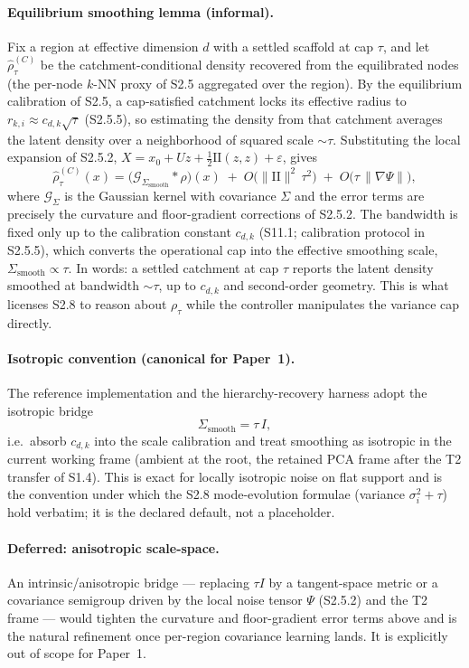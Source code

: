 \documentclass[11pt]{article}
\begin{document}
\paragraph{Equilibrium smoothing lemma (informal).}
Fix a region at effective dimension $d$ with a settled scaffold at cap $\tau$,
and let $\widehat\rho^{(C)}_\tau$ be the catchment-conditional density recovered
from the equilibrated nodes (the per-node $k$-NN proxy of S2.5 aggregated over
the region). By the equilibrium calibration of S2.5, a cap-satisfied catchment
locks its effective radius to $r_{k,i}\approx c_{d,k}\sqrt\tau$ (S2.5.5), so estimating the
density from that catchment averages the latent density over a neighborhood of
squared scale $\sim\tau$. Substituting the local expansion of S2.5.2,
$X=x_0+Uz+\tfrac12\mathrm{II}(z,z)+\varepsilon$, gives
\[
\widehat\rho^{(C)}_\tau(x)
=
\bigl(\mathcal G_{\Sigma_{\mathrm{smooth}}}\!*\rho\bigr)(x)
\;+\;
O\!\bigl(\|\mathrm{II}\|^2\,\tau^2\bigr)
\;+\;
O\!\bigl(\tau\,\|\nabla\Psi\|\bigr),
\]
where $\mathcal G_\Sigma$ is the Gaussian kernel with covariance $\Sigma$ and the
error terms are precisely the curvature and floor-gradient corrections of
S2.5.2. The bandwidth is fixed only up to the calibration constant $c_{d,k}$
(S11.1; calibration protocol in S2.5.5), which converts the operational
cap into the effective smoothing scale, $\Sigma_{\mathrm{smooth}}\propto\tau$. In
words: a settled catchment at cap $\tau$ reports the latent density smoothed at
bandwidth $\sim\tau$, up to $c_{d,k}$ and second-order geometry. This is what
licenses S2.8 to reason about $\rho_\tau$ while the controller manipulates the
variance cap directly.

\paragraph{Isotropic convention (canonical for Paper~1).}
The reference implementation and the hierarchy-recovery harness adopt the
isotropic bridge
\[
\Sigma_{\mathrm{smooth}}=\tau\,I,
\]
i.e.\ absorb $c_{d,k}$ into the scale calibration and treat smoothing as
isotropic in the current working frame (ambient at the root, the retained PCA
frame after the T2 transfer of S1.4). This is exact for locally isotropic noise
on flat support and is the convention under which the S2.8 mode-evolution
formulae (variance $\sigma_i^2+\tau$) hold verbatim; it is the declared default,
not a placeholder.

\paragraph{Deferred: anisotropic scale-space.}
An intrinsic/anisotropic bridge --- replacing $\tau I$ by a tangent-space metric
or a covariance semigroup driven by the local noise tensor $\Psi$ (S2.5.2) and
the T2 frame --- would tighten the curvature and floor-gradient error terms above
and is the natural refinement once per-region covariance learning lands. It is
explicitly out of scope for Paper~1.
\end{document}
